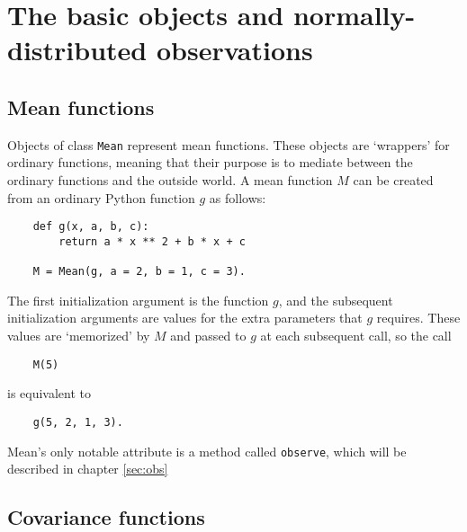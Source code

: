\documentclass{report}
\begin{document}
\chapter{The basic objects and normally-distributed observations}\label{cha:basics} %
\section{Mean functions}

Objects of class \texttt{Mean} represent mean functions. These objects are `wrappers' for ordinary functions, meaning that their purpose is to mediate between the ordinary functions and the outside world. A mean function $M$ can be created from an ordinary Python function $g$ as follows:
\begin{verbatim}
    def g(x, a, b, c):
        return a * x ** 2 + b * x + c
    
    M = Mean(g, a = 2, b = 1, c = 3).
\end{verbatim}
The first initialization argument is the function $g$, and the subsequent initialization arguments are values for the extra parameters that $g$ requires. These values are `memorized' by $M$ and passed to $g$ at each subsequent call, so the call
\begin{verbatim}
    M(5)
\end{verbatim}
is equivalent to
\begin{verbatim}
    g(5, 2, 1, 3).
\end{verbatim}
Mean's only notable attribute is a method called \texttt{observe}, which will be described in chapter \ref{sec:obs} 

\section{Covariance functions} \label{sec:cov} 
\end{document}
